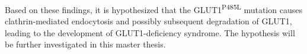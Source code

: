 Based on these findings, it is hypothesized that the GLUT1\textsuperscript{P485L} mutation causes clathrin-mediated endocytosis and possibly subsequent degradation of GLUT1, leading to the development of GLUT1-deficiency syndrome. The hypothesis will be further investigated in this master thesis.

\newcommand{\keyword}[1]{\textbf{#1}}
\newcommand{\tabhead}[1]{\textbf{#1}}
\newcommand{\code}[1]{\texttt{#1}}
\newcommand{\file}[1]{\texttt{\bfseries#1}}
\newcommand{\option}[1]{\texttt{\itshape#1}}


